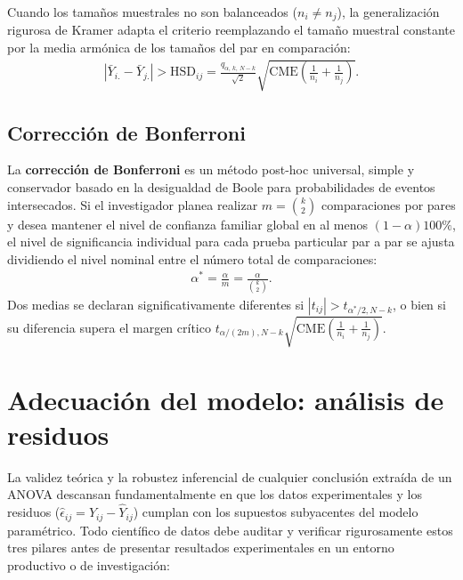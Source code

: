 \begin{teorema}
	Cuando los tamaños muestrales no son balanceados ($n_i \neq n_j$), la generalización rigurosa de Kramer adapta el criterio reemplazando el tamaño muestral constante por la media armónica de los tamaños del par en comparación:
	\begin{align}
		|\bar{Y}_{i.} - \bar{Y}_{j.}| > \text{HSD}_{ij} = \frac{q_{\alpha, \, k, \, N-k}}{\sqrt{2}} \sqrt{\text{CME} \left( \frac{1}{n_i} + \frac{1}{n_j} \right)}.
	\end{align}
\end{teorema}

\subsection*{Corrección de Bonferroni}

La \textbf{corrección de Bonferroni} es un método post-hoc universal, simple y conservador basado en la desigualdad de Boole para probabilidades de eventos intersecados. Si el investigador planea realizar $m = \binom{k}{2}$ comparaciones por pares y desea mantener el nivel de confianza familiar global en al menos $(1-\alpha)100\%$, el nivel de significancia individual para cada prueba particular par a par se ajusta dividiendo el nivel nominal entre el número total de comparaciones:
\begin{align}
	\alpha^* = \frac{\alpha}{m} = \frac{\alpha}{\binom{k}{2}}.
\end{align}
Dos medias se declaran significativamente diferentes si $|t_{ij}| > t_{\alpha^*/2, N-k}$, o bien si su diferencia supera el margen crítico $t_{\alpha/(2m), N-k} \sqrt{\text{CME}(\frac{1}{n_i}+\frac{1}{n_j})}$.

\section{Adecuación del modelo: análisis de residuos}

La validez teórica y la robustez inferencial de cualquier conclusión extraída de un ANOVA descansan fundamentalmente en que los datos experimentales y los residuos ($\hat{\epsilon}_{ij} = Y_{ij} - \hat{Y}_{ij}$) cumplan con los supuestos subyacentes del modelo paramétrico. Todo científico de datos debe auditar y verificar rigurosamente estos tres pilares antes de presentar resultados experimentales en un entorno productivo o de investigación:

